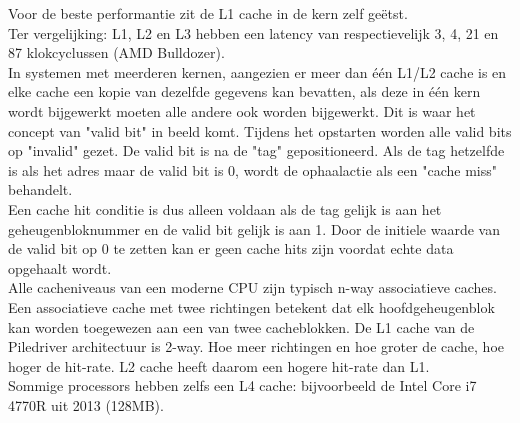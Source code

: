  Voor de beste performantie zit de L1 cache in de kern zelf geëtst.\\
 Ter vergelijking: L1, L2 en L3 hebben een latency van respectievelijk 3, 4, 21 en 87 klokcyclussen (AMD Bulldozer).\\
 In systemen met meerderen kernen, aangezien er meer dan één L1/L2 cache is en elke cache een kopie van dezelfde gegevens kan bevatten, als deze in één kern wordt bijgewerkt moeten alle andere ook worden bijgewerkt.
 Dit is waar het concept van "valid bit" in beeld komt.
 Tijdens het opstarten worden alle valid bits op "invalid" gezet. De valid bit is na de "tag" gepositioneerd.
 Als de tag hetzelfde is als het adres maar de valid bit is 0, wordt de ophaalactie als een "cache miss" behandelt.\\
 Een cache hit conditie is dus alleen voldaan als de tag gelijk is aan het geheugenbloknummer en de valid bit gelijk is aan 1. Door de initiele waarde van de valid bit op 0 te zetten kan er geen cache hits zijn voordat echte data opgehaalt wordt.\\
Alle cacheniveaus van een moderne CPU zijn typisch n-way associatieve caches. Een associatieve cache met twee richtingen betekent dat elk hoofdgeheugenblok kan worden toegewezen aan een van twee cacheblokken. De L1 cache van de Piledriver architectuur is 2-way.\parencite{Hruska2017}
Hoe meer richtingen en hoe groter de cache, hoe hoger de hit-rate. L2 cache heeft daarom een hogere hit-rate dan L1.\\
Sommige processors hebben zelfs een L4 cache: bijvoorbeeld de Intel Core i7 4770R uit 2013 (128MB).

